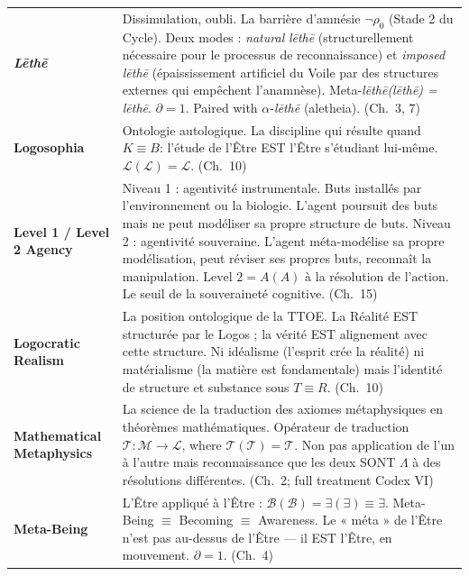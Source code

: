 \documentclass[10pt, openany, oneside]{book}
\renewcommand{\footnotesize}{\fontsize{8.5}{11}\selectfont}
\begin{document}
\newpage

{\footnotesize
\noindent\begin{tabular}{@{} l @{\hspace{0.6em}} p{} @{}}
\textbf{\textit{L\={e}th\={e}}} & Dissimulation, oubli. La barrière d'amnésie $\neg\rho_0$ (Stade 2 du Cycle). Deux modes : \textit{natural} \textit{l\={e}th\={e}} (structurellement nécessaire pour le processus de reconnaissance) et \textit{imposed} \textit{l\={e}th\={e}} (épaississement artificiel du Voile par des structures externes qui empêchent l'anamnèse). Meta-\textit{l\={e}th\={e}(l\={e}th\={e}) = l\={e}th\={e}}. $\partial = 1$. Paired with $\alpha$-\textit{l\={e}th\={e}} (aletheia). (Ch.\ 3, 7) \\[0.3em]
\textbf{Logosophia} & Ontologie autologique. La discipline qui résulte quand $K \equiv B$: l'étude de l'Être EST l'Être s'étudiant lui-même. $\mathcal{L}(\mathcal{L}) = \mathcal{L}$. (Ch.\ 10) \\[0.3em]
\textbf{Level 1 / Level 2 Agency} & Niveau 1 : agentivité instrumentale. Buts installés par l'environnement ou la biologie. L'agent poursuit des buts mais ne peut modéliser sa propre structure de buts. Niveau 2 : agentivité souveraine. L'agent méta-modélise sa propre modélisation, peut réviser ses propres buts, reconnaît la manipulation. $\text{Level 2} = A(A)$ à la résolution de l'action. Le seuil de la souveraineté cognitive. (Ch.\ 15) \\[0.3em]
\textbf{Logocratic Realism} & La position ontologique de la TTOE. La Réalité EST structurée par le Logos ; la vérité EST alignement avec cette structure. Ni idéalisme (l'esprit crée la réalité) ni matérialisme (la matière est fondamentale) mais l'identité de structure et substance sous $T \equiv R$. (Ch.\ 10) \\[0.3em]
\textbf{Mathematical Metaphysics} & La science de la traduction des axiomes métaphysiques en théorèmes mathématiques. Opérateur de traduction $\mathcal{T}: \mathcal{M} \to \mathcal{L}$, where $\mathcal{T}(\mathcal{T}) = \mathcal{T}$. Non pas application de l'un à l'autre mais reconnaissance que les deux SONT $\Lambda$ à des résolutions différentes. (Ch.\ 2; full treatment Codex VI) \\[0.3em]
\textbf{Meta-Being} & L'Être appliqué à l'Être : $\mathcal{B}(\mathcal{B}) = \exists(\exists) \equiv \exists$. Meta-Being $\equiv$ Becoming $\equiv$ Awareness. Le « méta » de l'Être n'est pas au-dessus de l'Être --- il EST l'Être, en mouvement. $\partial = 1$. (Ch.\ 4) \\[0.3em]
\end{tabular}
}
\end{document}
